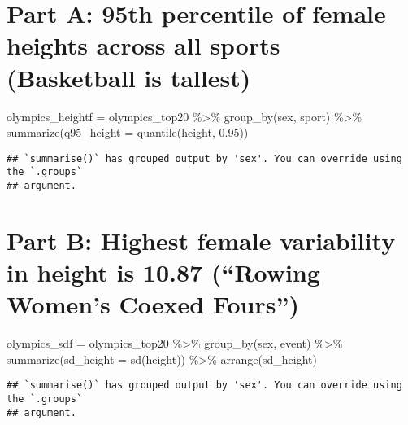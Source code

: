 \documentclass[
]{article}
\newenvironment{Shaded}{\begin{snugshade}}{\end{snugshade}}
\newcommand{\AttributeTok}[1]{\textcolor[rgb]{0.77,0.63,0.00}{#1}}
\newcommand{\FloatTok}[1]{\textcolor[rgb]{0.00,0.00,0.81}{#1}}
\newcommand{\FunctionTok}[1]{\textcolor[rgb]{0.00,0.00,0.00}{#1}}
\newcommand{\NormalTok}[1]{#1}
\newcommand{\OtherTok}[1]{\textcolor[rgb]{0.56,0.35,0.01}{#1}}
\newcommand{\SpecialCharTok}[1]{\textcolor[rgb]{0.00,0.00,0.00}{#1}}
\begin{document}
\hypertarget{part-a-95th-percentile-of-female-heights-across-all-sports-basketball-is-tallest}{%
\section{Part A: 95th percentile of female heights across all sports
(Basketball is
tallest)}\label{part-a-95th-percentile-of-female-heights-across-all-sports-basketball-is-tallest}}

\begin{Shaded}
\begin{Highlighting}[]
\NormalTok{olympics\_heightf }\OtherTok{=}\NormalTok{ olympics\_top20 }\SpecialCharTok{\%\textgreater{}\%}
\FunctionTok{group\_by}\NormalTok{(sex, sport) }\SpecialCharTok{\%\textgreater{}\%}
\FunctionTok{summarize}\NormalTok{(}\AttributeTok{q95\_height =} \FunctionTok{quantile}\NormalTok{(height, }\FloatTok{0.95}\NormalTok{))}
\end{Highlighting}
\end{Shaded}

\begin{verbatim}
## `summarise()` has grouped output by 'sex'. You can override using the `.groups`
## argument.
\end{verbatim}

\hypertarget{part-b-highest-female-variability-in-height-is-10.87-rowing-womens-coexed-fours}{%
\section{Part B: Highest female variability in height is 10.87 (``Rowing
Women's Coexed
Fours'')}\label{part-b-highest-female-variability-in-height-is-10.87-rowing-womens-coexed-fours}}

\begin{Shaded}
\begin{Highlighting}[]
\NormalTok{olympics\_sdf }\OtherTok{=}\NormalTok{ olympics\_top20 }\SpecialCharTok{\%\textgreater{}\%}
\FunctionTok{group\_by}\NormalTok{(sex, event) }\SpecialCharTok{\%\textgreater{}\%}
\FunctionTok{summarize}\NormalTok{(}\AttributeTok{sd\_height =} \FunctionTok{sd}\NormalTok{(height)) }\SpecialCharTok{\%\textgreater{}\%}
\FunctionTok{arrange}\NormalTok{(sd\_height)}
\end{Highlighting}
\end{Shaded}

\begin{verbatim}
## `summarise()` has grouped output by 'sex'. You can override using the `.groups`
## argument.
\end{verbatim}
\end{document}
